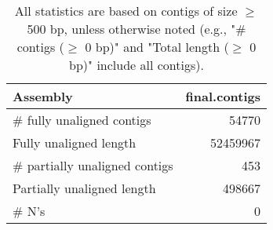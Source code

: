 \documentclass[12pt,a4paper]{article}
\begin{document}
\begin{table}[ht]
\begin{center}
\caption{All statistics are based on contigs of size $\geq$ 500 bp, unless otherwise noted (e.g., "\# contigs ($\geq$ 0 bp)" and "Total length ($\geq$ 0 bp)" include all contigs).}
\begin{tabular}{|l*{1}{|r}|}
\hline
Assembly & final.contigs \\ \hline
\# fully unaligned contigs & 54770 \\ \hline
Fully unaligned length & 52459967 \\ \hline
\# partially unaligned contigs & 453 \\ \hline
Partially unaligned length & 498667 \\ \hline
\# N's & 0 \\ \hline
\end{tabular}
\end{center}
\end{table}
\end{document}
